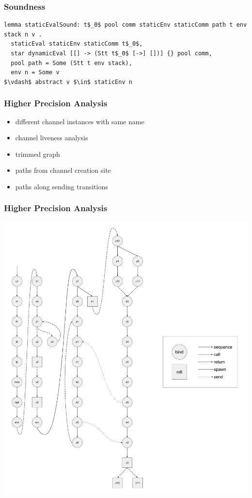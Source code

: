 \documentclass{beamer}
\begin{document}
\begin{frame}[fragile]
	\frametitle{Soundness}
\begin{lstlisting}[language=logic, mathescape]
lemma staticEvalSound: t$_0$ pool comm staticEnv staticComm path t env stack n v .
  staticEval staticEnv staticComm t$_0$, 
  star dynamicEval [[] -> (Stt t$_0$ [->] [])] {} pool comm,
  pool path = Some (Stt t env stack), 
  env n = Some v
$\vdash$ abstract v $\in$ staticEnv n 
\end{lstlisting}
\end{frame}


\begin{frame}
\frametitle{Higher Precision Analysis}
\begin{itemize}
\item different channel instances with same name  
\item channel liveness analysis
\item trimmed graph
\item paths from channel creation site
\item paths along sending transitions 
\end{itemize}
\end{frame}

\begin{frame}
\frametitle{Higher Precision Analysis}
\includegraphics[width=.7\textwidth]{cml-graph-lp.pdf}
\end{frame}
\end{document}
